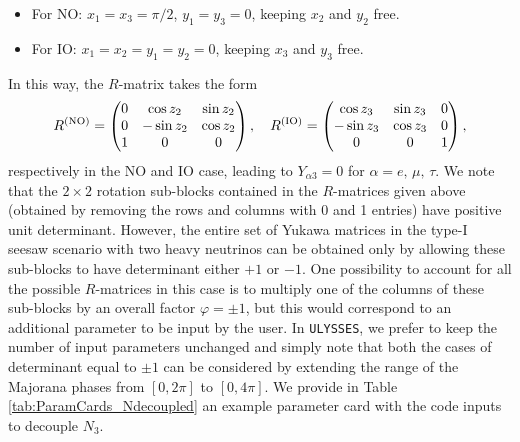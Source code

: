 \documentclass[12pt, a4paper]{article}
\begin{document}
\begin{itemize}
 \item For NO: $x_1 = x_3 = \pi/2$, $y_1 = y_3 = 0$, keeping $x_2$ and $y_2$ free.
 \item For IO: $x_1 = x_2 = y_1 = y_2 = 0$, keeping $x_3$ and $y_3$ free.
\end{itemize}
In this way, the $R$-matrix takes the 
form
\begin{equation}
 R^{\rm (NO)} 
=
\begin{pmatrix}
0 & \cos z_2 & \sin z_2 \\
0 & -\sin z_2 & \cos z_2 \\
1 & 0 & 0
\end{pmatrix},
\quad
R^{\rm (IO)} 
=
\begin{pmatrix}
\cos z_3 & \sin z_3 & 0 \\
-\sin z_3 & \cos z_3 & 0 \\
0 & 0 & 1
\end{pmatrix},
\end{equation}
respectively in the NO and IO case, leading to $Y_{\alpha 3} = 0$ for $\alpha = e,\,\mu,\,\tau$. We note that the $2\times 2$ rotation sub-blocks contained in the $R$-matrices given above (obtained by removing the rows and columns with 0 and 1 entries) have positive unit determinant. However, the entire set of Yukawa matrices in the type-I seesaw scenario with two heavy neutrinos can be obtained only by allowing these sub-blocks to have determinant either $+1$ or $-1$. One possibility to account for all the possible $R$-matrices in this case is to multiply one of the columns of these sub-blocks by an overall factor $\varphi = \pm 1$, but this would correspond to an additional parameter to be input by the user. In \texttt{ULYSSES}, we prefer to keep the number of input parameters unchanged and simply note that both the cases of determinant equal to $\pm 1$ can be considered by extending the range of the Majorana phases from $[0, 2\pi]$ to $[0, 4\pi]$. We provide in Table \ref{tab:ParamCards_Ndecoupled} an example parameter card with the code inputs to decouple $N_3$.
 
\end{document}
